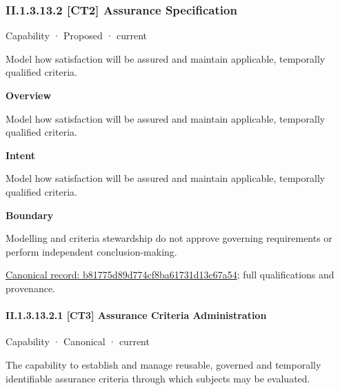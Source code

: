 \subsubsection*{II.1.3.13.2 [CT2] Assurance Specification}
\label{navigation:II.1.3.13.2}

\label{element:b81775d89d774cf8ba61731d13c67a54}
{\small Capability · Proposed · current}\par

Model how satisfaction will be assured and maintain applicable, temporally qualified criteria.



\textbf{Overview}



Model how satisfaction will be assured and maintain applicable, temporally qualified criteria.



\textbf{Intent}



Model how satisfaction will be assured and maintain applicable, temporally qualified criteria.



\textbf{Boundary}



Modelling and criteria stewardship do not approve governing requirements or perform independent conclusion-making.


{\footnotesize \href{../../../../continuum/strategy/capability/b81775d89d774cf8ba61731d13c67a54.md}{Canonical record: b81775d89d774cf8ba61731d13c67a54}; full qualifications and provenance.}\par
\paragraph*{II.1.3.13.2.1 [CT3] Assurance Criteria Administration}
\label{navigation:II.1.3.13.2.1}

\label{element:1bfd71f24321428c8871b587d413f47e}
{\small Capability · Canonical · current}\par

The capability to establish and manage reusable, governed and temporally identifiable assurance criteria through which subjects may be evaluated.



